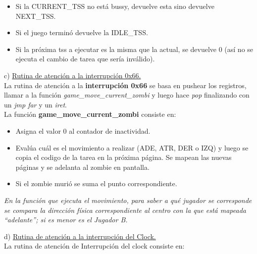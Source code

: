 \documentclass[a4paper]{article}
\begin{document}
\begin{itemize}
\item Si la CURRENT_TSS no est\'a bussy, devuelve esta sino devuelve NEXT_TSS.
\item Si el juego termin\'o devuelve la IDLE_TSS.
\item Si la pr\'oxima tss a ejecutar es la misma que la actual, se devuelve 0 (as\'i no se ejecuta el cambio de tarea que ser\'ia inv\'alido).
\end{itemize}

\bigskip

{\large c)} \underline{Rutina de atenci\'on a la interrupci\'on 0x66.}\\

La rutina de atenci\'on a la \textbf{interrupci\'on 0x66 }se basa en pushear los registros, llamar a la funci\'on \textit{game_move_current_zombi} y luego hace \textit{pop} finalizando con un \textit{jmp far} y un\textit{ iret}.\\

La funci\'on \textbf{game_move_current_zombi} consiste en:

\begin{itemize}
\item Asigna el valor 0 al contador de inactividad.
\item Eval\'ua cu\'al es el movimiento a realizar (ADE, ATR, DER o IZQ) y luego se copia el codigo de la tarea en la pr\'oxima p\'agina. Se mapean las nuevas p\'aginas y se adelanta al zombie en pantalla.
\item Si el zombie muri\'o se suma el punto correspondiente.
\end{itemize}

\textit{
En la funci\'on que ejecuta el movimiento, para saber a qu\'e jugador se corresponde se compara la direcci\'on f\'isica correspondiente al centro con la que est\'a mapeada ``adelante''; si es menor es el Jugador B.\\}



\newpage
{\large d)} \underline{Rutina de atenci\'on a la interrupci\'on del Clock.}\\

La rutina de atenci\'on de Interrupci\'on del clock consiste en:
\end{document}
